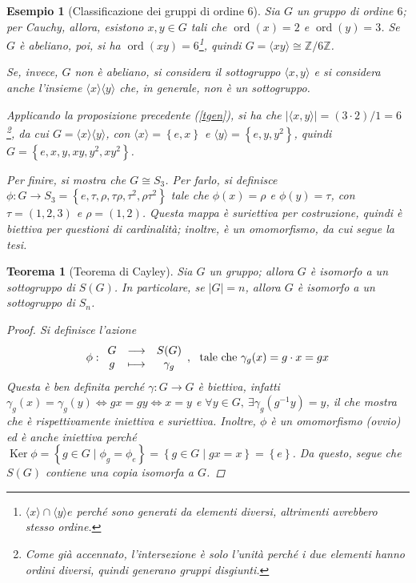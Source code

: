 \documentclass[12pt]{scrartcl}
\theoremstyle{style}
\newtheorem{esempio}{Esempio}[section]
\newtheorem{teorema}{Teorema}[section]
\numberwithin{equation}{subsection}
\begin{document}
\begin{esempio}[Classificazione dei gruppi di ordine 6]
Sia $G$ un gruppo di ordine $6$; per Cauchy, allora, esistono $x,y \in G$ tali che $\operatorname{ord}(x) = 2$ e $\operatorname{ord}(y) =3$. 
Se $G$ \`e abeliano, poi, si ha $\operatorname{ord}(xy) = 6$\footnote{$\langle x \rangle \cap \langle y \rangle e$ perch\'e sono generati da elementi diversi, altrimenti avrebbero stesso ordine.}, quindi $G = \langle xy \rangle\cong \mathbb{Z}/ 6\mathbb{Z}$.

Se, invece, $G$ non \`e abeliano, si considera il sottogruppo $\langle x,y \rangle$ e si considera anche l'insieme $\langle x \rangle\langle y \rangle$ che, in generale, non \`e un sottogruppo.

Applicando la proposizione precedente (\ref{tgen}), si ha che $\lvert \langle x,y \rangle \rvert = (3 \cdot 2) / 1= 6$\footnote{Come gi\`a accennato, l'intersezione \`e solo l'unit\`a perch\'e i due elementi hanno ordini diversi, quindi generano gruppi disgiunti.}, da cui $G = \langle x \rangle\langle y \rangle$, con $\langle x \rangle= \left\{ e,x \right\} $ e $\langle y \rangle= \left\{ e,y,y^2 \right\} $, quindi $G = \left\{ e , x ,y, xy,y^2 , xy^2 \right\} $.

Per finire, si mostra che $G \cong S_3$. 
Per farlo, si definisce $\phi :G \to S_3=\left\{ e,\tau ,\rho ,\tau \rho ,\tau ^2,\rho \tau ^2 \right\} $ tale che $\phi (x) = \rho $ e $\phi (y) = \tau $, con $\tau =(1,2,3)$ e $\rho = (1,2)$.
Questa mappa \`e suriettiva per costruzione, quindi \`e biettiva per questioni di cardinalit\`a; inoltre, \`e un omomorfismo, da cui segue la tesi.
\end{esempio}

\begin{teorema}
	[Teorema di Cayley]
	Sia $G$ un gruppo; allora $G$ \`e isomorfo a un sottogruppo di $S(G)$.
	In particolare, se $|G| = n$, allora $G$ \`e isomorfo a un sottogruppo di $S_n$.
	\begin{proof}
		Si definisce l'azione
		\[
		\phi : 
		\begin{array}
			{c c c}
			G & \longrightarrow & S(G)\\
			g & \longmapsto & \gamma_g
		\end{array}, \ \text{ tale che } \gamma_g(x) = g\cdot  x=gx
		\] 
		Questa \`e ben definita perch\'e $\gamma:G \to G$ \`e biettiva, infatti $\gamma_g(x) = \gamma_g(y) \iff g x = g y \iff x = y$ e $\forall y \in G , \ \exists \gamma_g(g^{-1} y) = y $, il che mostra che \`e rispettivamente iniettiva e suriettiva.
		Inoltre, $\phi $ \`e un omomorfismo (ovvio) ed \`e anche iniettiva perch\'e $\operatorname{Ker} \phi = \left\{ g \in G  \mid \phi _g = \phi _e \right\} = \left\{ g \in G  \mid g x = x \right\} = \left\{ e \right\}$.
		Da questo, segue che $S(G)$ contiene una copia isomorfa a $G$.
	\end{proof}
\end{teorema}
\end{document}
